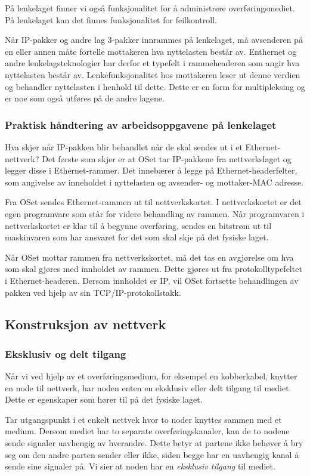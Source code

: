 \documentclass[11pt,a4paper]{article}
\begin{document}
På lenkelaget finner vi også funksjonalitet for å administrere overføringsmediet. På lenkelaget kan det finnes funksjonalitet for feilkontroll.

Når IP-pakker og andre lag 3-pakker innrammes på lenkelaget, må avsenderen på en eller annen måte fortelle mottakeren hva nyttelasten består av. Enthernet og andre lenkelagsteknologier har derfor et typefelt i rammeheaderen som angir hva nyttelasten består av. Lenkefunksjonalitet hos mottakeren leser ut denne verdien og behandler nyttelasten i henhold til dette. Dette er en form for multipleksing og er noe som også utføres på de andre lagene.

\subsubsection{Praktisk håndtering av arbeidsoppgavene på lenkelaget}
Hva skjer når IP-pakken blir behandlet når de skal sendes ut i et Ethernet-nettverk? Det første som skjer er at OSet tar IP-pakkene fra nettverkslaget og legger disse i Ethernet-rammer. Det innebærer å legge på Ethernet-headerfelter, som angivelse av inneholdet i nyttelasten og avsender- og mottaker-MAC adresse. 

Fra OSet sendes Ethernet-rammen ut til nettverkskortet. I nettverkskortet er det egen programvare som står for videre behandling av rammen. Når programvaren i nettverkskortet er klar til å begynne overføring, sendes en bitstrøm ut til maskinvaren som har ansvaret for det som skal skje på det fysiske laget.

Når OSet mottar rammen fra nettverkskortet, må det tas en avgjørelse om hva som skal gjøres med innholdet av rammen. Dette gjøres ut fra protokolltypefeltet i Ethernet-headeren. Dersom innholdet er IP, vil OSet fortsette behandlingen av pakken ved hjelp av sin TCP/IP-protokollstakk.

\subsection{Konstruksjon av nettverk}
\subsubsection{Eksklusiv og delt tilgang}
Når vi ved hjelp av et overføringsmedium, for eksempel en kobberkabel, knytter en node til nettverk, har noden enten en eksklusiv eller delt tilgang til mediet. Dette er egenskaper som hører til på det fysiske laget.

Tar utgangspunkt i et enkelt nettvek hvor to noder knyttes sammen med et medium. Dersom mediet har to separate overføringskanaler, kan de to nodene sende signaler uavhengig av hverandre. Dette betyr at partene ikke behøver å bry seg om den andre parten sender eller ikke, siden begge har en uavhengig kanal å sende sine signaler på. Vi sier at noden har en \textit{eksklusiv tilgang} til mediet.
\end{document}
